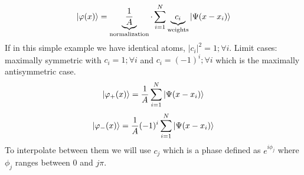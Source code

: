 \begin{equation}
    \ket{\varphi(x)} = \underbrace{\frac{1}{A}}_{\text{normalization}}\cdot \sum_{i=1}^{N} \underbrace{c_i}_{\text{weights}} \ket{\Psi(x-x_i)}
\end{equation}
If in this simple example we have identical atoms, $|c_i|^2 = 1; \forall i$. Limit cases: maximally symmetric with $c_i = 1; \forall i$ and $c_i = (-1)^i; \forall i$ which is the maximally antisymmetric case.
\begin{equation}
    \ket{\varphi_+(x)} = \frac{1}{A} \sum_{i=1}^{N} \ket{\Psi(x-x_i)}
\end{equation}
\begin{equation}
    \ket{\varphi_-(x)} = \frac{1}{A} (-1)^i \sum_{i=1}^{N} \ket{\Psi(x-x_i)}
\end{equation}
To interpolate between them we will use $c_j$ which is a phase defined as $e^{i\phi_j}$ where $\phi_j$ ranges between $0$ and $j\pi$.

